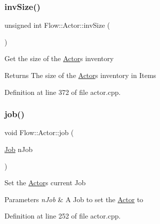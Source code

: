 \hypertarget{class_flow_1_1_actor_a6bc972a1ad28bbdb4b30f73779a1f78d}{}\label{class_flow_1_1_actor_a6bc972a1ad28bbdb4b30f73779a1f78d} 
\subsubsection{\texorpdfstring{inv\+Size()}{invSize()}}
{\footnotesize\ttfamily unsigned int Flow\+::\+Actor\+::inv\+Size (\begin{DoxyParamCaption}{ }\end{DoxyParamCaption})}

Get the size of the \hyperlink{class_flow_1_1_actor}{Actor}\textquotesingle{}s inventory \begin{DoxyReturn}{Returns}
The size of the \hyperlink{class_flow_1_1_actor}{Actor}\textquotesingle{}s inventory in Items 
\end{DoxyReturn}


Definition at line 372 of file actor.\+cpp.

\hypertarget{class_flow_1_1_actor_ac107aa0995c0532286dea215ef912cc5}{}\label{class_flow_1_1_actor_ac107aa0995c0532286dea215ef912cc5} 
\subsubsection{\texorpdfstring{job()}{job()}\hspace{0.1cm}{\footnotesize\ttfamily [1/2]}}
{\footnotesize\ttfamily void Flow\+::\+Actor\+::job (\begin{DoxyParamCaption}\item[{\hyperlink{namespace_flow_a05bb774db920847e46f3779aaef1b07b}{Job}}]{n\+Job }\end{DoxyParamCaption})}

Set the \hyperlink{class_flow_1_1_actor}{Actor}\textquotesingle{}s current Job 
\begin{DoxyParams}{Parameters}
{\em n\+Job} & A Job to set the \hyperlink{class_flow_1_1_actor}{Actor} to \\
\hline
\end{DoxyParams}


Definition at line 252 of file actor.\+cpp.

\hypertarget{class_flow_1_1_actor_aac6046fc99b742a2307084b0b366c2ed}{}\label{class_flow_1_1_actor_aac6046fc99b742a2307084b0b366c2ed} 
